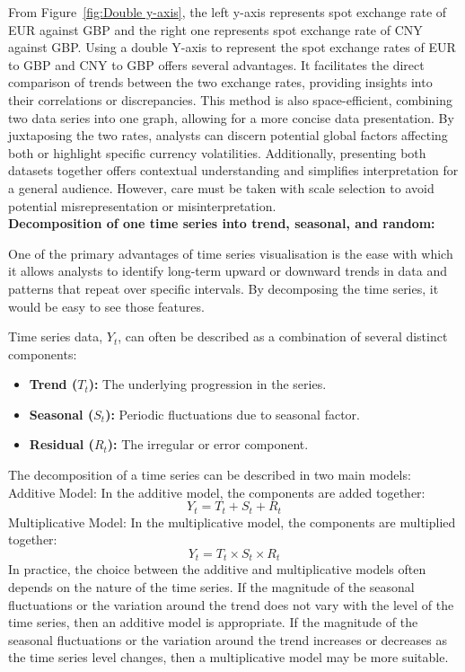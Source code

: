 \documentclass{article}\usepackage[]{graphicx}\usepackage[]{xcolor}
\begin{document}
From Figure~\ref{fig:Double y-axis}, the left y-axis represents spot exchange rate of EUR against GBP and the right one represents spot exchange rate of CNY against GBP. Using a double Y-axis to represent the spot exchange rates of EUR to GBP and CNY to GBP offers several advantages. It facilitates the direct comparison of trends between the two exchange rates, providing insights into their correlations or discrepancies. This method is also space-efficient, combining two data series into one graph, allowing for a more concise data presentation. By juxtaposing the two rates, analysts can discern potential global factors affecting both or highlight specific currency volatilities. Additionally, presenting both datasets together offers contextual understanding and simplifies interpretation for a general audience. However, care must be taken with scale selection to avoid potential misrepresentation or misinterpretation.
\\
\noindent
\textbf{Decomposition of one time series into trend, seasonal, and random:}

One of the primary advantages of time series visualisation is the ease with which it allows analysts to identify long-term upward or downward trends in data and patterns that repeat over specific intervals. By decomposing the time series, it would be easy to see those features.

Time series data, $Y_t$, can often be described as a combination of several distinct components:
\begin{itemize}
    \item \textbf{Trend ($T_t$):} The underlying progression in the series.
    \item \textbf{Seasonal ($S_t$):} Periodic fluctuations due to seasonal factor.
    \item \textbf{Residual ($R_t$):} The irregular or error component.
\end{itemize}

The decomposition of a time series can be described in two main models:\\
Additive Model:
In the additive model, the components are added together:
\[
Y_t = T_t + S_t + R_t
\]
Multiplicative Model:
In the multiplicative model, the components are multiplied together:
\[
Y_t = T_t \times S_t \times R_t
\]
In practice, the choice between the additive and multiplicative models often depends on the nature of the time series. If the magnitude of the seasonal fluctuations or the variation around the trend does not vary with the level of the time series, then an additive model is appropriate. If the magnitude of the seasonal fluctuations or the variation around the trend increases or decreases as the time series level changes, then a multiplicative model may be more suitable.
\end{document}
